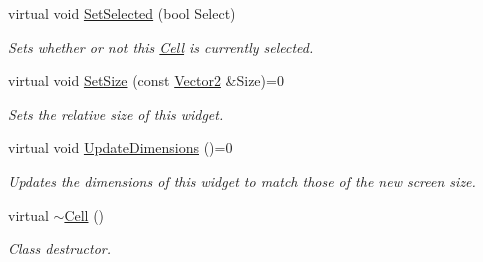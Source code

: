 \begin{DoxyCompactItemize}
virtual void \hyperlink{classMezzanine_1_1UI_1_1Cell_ace3c3a5b3dc357ec8db0d164ff1ac50c}{SetSelected} (bool Select)
\begin{DoxyCompactList}\small\item\em Sets whether or not this \hyperlink{classMezzanine_1_1UI_1_1Cell}{Cell} is currently selected. \item\end{DoxyCompactList}\item 
virtual void \hyperlink{classMezzanine_1_1UI_1_1Cell_a07e76896846e18c9d7d72ba7b9c49ed3}{SetSize} (const \hyperlink{classMezzanine_1_1Vector2}{Vector2} \&Size)=0
\begin{DoxyCompactList}\small\item\em Sets the relative size of this widget. \item\end{DoxyCompactList}\item 
virtual void \hyperlink{classMezzanine_1_1UI_1_1Cell_a20af52a9a939d90b50a42b9c967c64d7}{UpdateDimensions} ()=0
\begin{DoxyCompactList}\small\item\em Updates the dimensions of this widget to match those of the new screen size. \item\end{DoxyCompactList}\item 
\hypertarget{classMezzanine_1_1UI_1_1Cell_a01dcc876783bc067c4c62f2d7ad16df3}{
virtual \hyperlink{classMezzanine_1_1UI_1_1Cell_a01dcc876783bc067c4c62f2d7ad16df3}{$\sim$Cell} ()}
\label{classMezzanine_1_1UI_1_1Cell_a01dcc876783bc067c4c62f2d7ad16df3}

\begin{DoxyCompactList}\small\item\em Class destructor. \item\end{DoxyCompactList}\end{DoxyCompactItemize}
